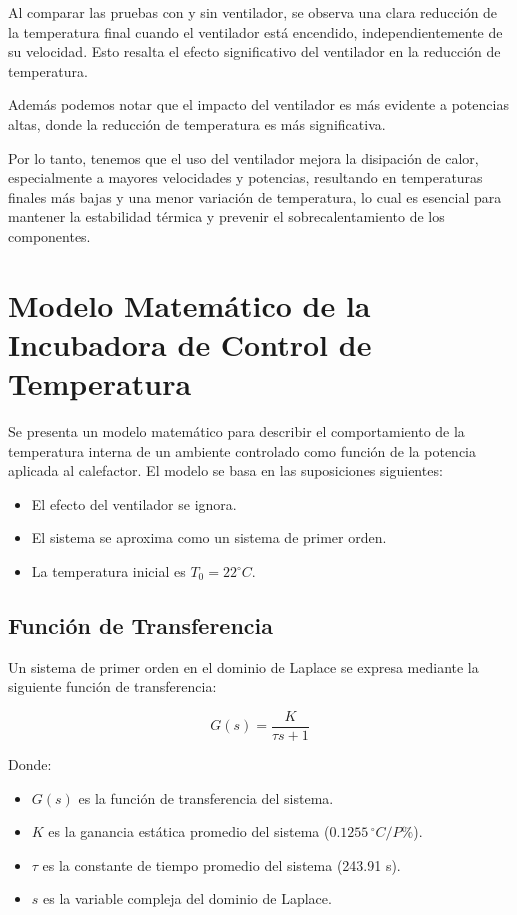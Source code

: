 \documentclass[spanish, a4paper, 11pt]{article}
\begin{document}
\FloatBarrier

Al comparar las pruebas con y sin ventilador, se observa una clara reducción de la temperatura final cuando el ventilador está encendido, independientemente de su velocidad. Esto resalta el efecto significativo del ventilador en la reducción de temperatura.


Además podemos notar que el impacto del ventilador es más evidente a potencias altas, donde la reducción de temperatura es más significativa.

Por lo tanto, tenemos que el uso del ventilador mejora la disipación de calor, especialmente a mayores velocidades y potencias, resultando en temperaturas finales más bajas y una menor variación de temperatura, lo cual es esencial para mantener la estabilidad térmica y prevenir el sobrecalentamiento de los componentes.

\newpage
\section{Modelo Matemático de la Incubadora de Control de Temperatura}  

Se presenta un modelo matemático para describir el comportamiento de la temperatura interna de un ambiente controlado como función de la potencia aplicada al calefactor. El modelo se basa en las suposiciones siguientes:

\begin{itemize}
    \item El efecto del ventilador se ignora.
    \item El sistema se aproxima como un sistema de primer orden.
    \item La temperatura inicial es \(T_0 = 22^\circ C\).
\end{itemize}

\subsection{Función de Transferencia}

Un sistema de primer orden en el dominio de Laplace se expresa mediante la siguiente función de transferencia:

\begin{equation}
    G(s) = \frac{K}{\tau s + 1}
\end{equation}

Donde:
\begin{itemize}
    \item \(G(s)\) es la función de transferencia del sistema.
    \item \(K\) es la ganancia estática promedio del sistema (\(0.1255 \, ^\circ C / P\%\)).
    \item \(\tau\) es la constante de tiempo promedio del sistema (243.91 s).
    \item \(s\) es la variable compleja del dominio de Laplace.
\end{itemize}
\end{document}
